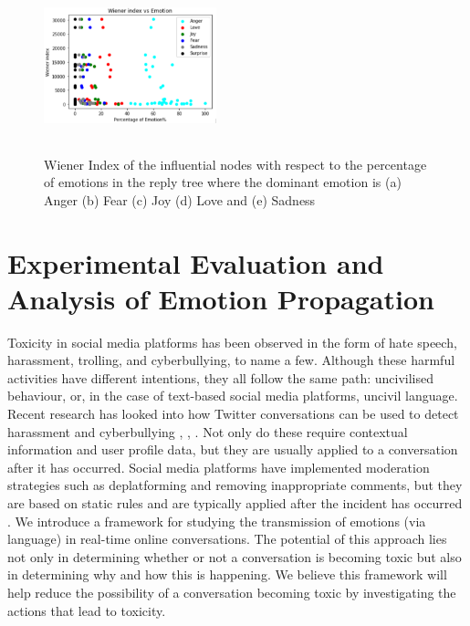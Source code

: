 \documentclass[acmtog]{acmart}
\begin{document}
\begin{figure}[h]
\begin{minipage}{.33\textwidth}
  \end{minipage}%
  \begin{minipage}{.33\textwidth}
    \centering
    \includegraphics[width=5cm,height=5cm,keepaspectratio]{WAnger_ws.pdf}
  \end{minipage}
  
  \caption{Wiener Index of the influential nodes with respect to the percentage of emotions in the reply tree where the dominant emotion is (a) Anger (b) Fear (c) Joy (d) Love and (e) Sadness}
  \label{SampleConv}
  \end{figure}
\section{Experimental Evaluation and Analysis of Emotion Propagation}
Toxicity in social media platforms has been observed in the form of hate speech, harassment, trolling, and cyberbullying, to name a few. Although these harmful activities have different intentions, they all follow the same path: uncivilised behaviour, or, in the case of text-based social media platforms, uncivil language. Recent research has looked into how Twitter conversations can be used to detect harassment and cyberbullying \cite{guberman2016quantifying}, \cite{georgakopoulos2019convolutional}, \cite{pavlopoulos2020toxicity}. Not only do these require contextual information and user profile data, but they are usually applied to a conversation after it has occurred. Social media platforms have implemented moderation strategies such as deplatforming and removing inappropriate comments, but they are based on static rules and are typically applied after the incident has occurred \cite{jhaver2021evaluating}. We introduce a framework for studying the transmission of emotions (via language) in real-time online conversations. The potential of this approach lies not only in determining whether or not a conversation is becoming toxic but also in determining why and how this is happening. We believe this framework will help reduce the possibility of a conversation becoming toxic by investigating the actions that lead to toxicity.
\end{document}
